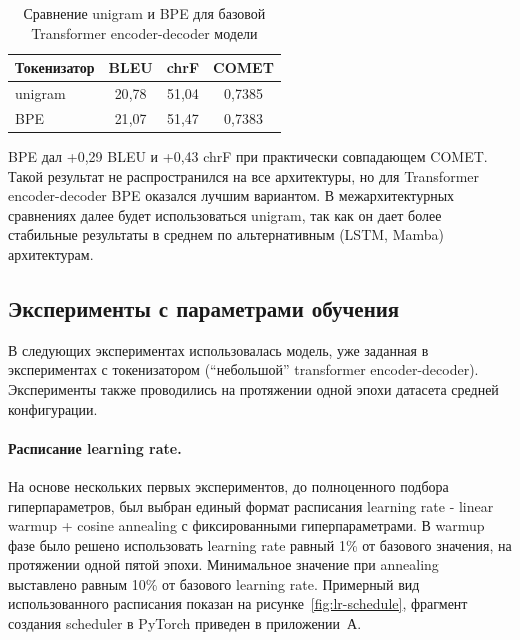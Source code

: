 \begin{table}[H]
	\centering
	\caption{Сравнение unigram и BPE для базовой Transformer encoder-decoder модели}
	\label{tab:tokenizer-comparison}
	\begin{tabular}{|p{}|c|c|c|}
		\hline
		\textbf{Токенизатор} & \textbf{BLEU} & \textbf{chrF} & \textbf{COMET} \\
		\hline
		unigram              & 20{,}78       & 51{,}04       & 0{,}7385       \\
		\hline
		BPE                  & 21{,}07       & 51{,}47       & 0{,}7383       \\
		\hline
	\end{tabular}
\end{table}

BPE дал +0{,}29 BLEU и +0{,}43 chrF при практически совпадающем COMET.
Такой результат не распространился на все архитектуры, но для Transformer encoder-decoder BPE оказался лучшим вариантом.
В межархитектурных сравнениях далее будет использоваться unigram, так как он дает более стабильные результаты в среднем по альтернативным (LSTM, Mamba) архитектурам.

\subsection{Эксперименты с параметрами обучения}

В следующих экспериментах использовалась модель, уже заданная в экспериментах с токенизатором (``небольшой'' transformer encoder-decoder).
Эксперименты также проводились на протяжении одной эпохи датасета средней конфигурации.

\paragraph{Расписание learning rate.}
На основе нескольких первых экспериментов, до полноценного подбора гиперпараметров, был выбран единый формат расписания learning rate - linear warmup + cosine annealing с фиксированными гиперпараметрами.
В warmup фазе было решено использовать learning rate равный 1\% от базового значения, на протяжении одной пятой эпохи.
Минимальное значение при annealing выставлено равным 10\% от базового learning rate.
Примерный вид использованного расписания показан на рисунке~\ref{fig:lr-schedule}, фрагмент создания scheduler в PyTorch приведен в приложении~А.

